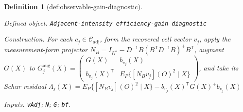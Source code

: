 \documentclass{article}
\newtheorem{definition}{Definition}
\begin{document}
\begin{definition}[def:observable-gain-diagnostic]\label{def:observable-gain-diagnostic}
\par\smallskip\noindent\emph{Defined object.} \texttt{Adjacent-\allowbreak{}intensity efficiency-\allowbreak{}gain diagnostic}
\par\smallskip\noindent\emph{Construction.} For each \(c_j\in\mathcal C_{\mathrm{adj}}\), form the recovered cell vector \(v_j\), apply the measurement-form projector \(N_B=I_{K^{2}}-D^{-1}B(B^{\mathsf T}D^{-1}B)^{+}B^{\mathsf T}\), augment \(G(X)\) to \(G_j^{\mathrm{aug}}(X)=\begin{pmatrix}G(X)&b_{v_j}(X)\\b_{v_j}(X)^{\mathsf T}&E_P\{[N_Bv_j](O)^2\mid X\}\end{pmatrix}\), and take its Schur residual \(\Lambda_j(X)=E_P\{[N_Bv_j](O)^2\mid X\}-b_{v_j}(X)^{\mathsf T}G(X)^{+}b_{v_j}(X)\)
\par\smallskip\noindent\emph{Inputs.} \texttt{vAdj}; \texttt{N}; \texttt{G}; \texttt{bf}.
\end{definition}
\end{document}
